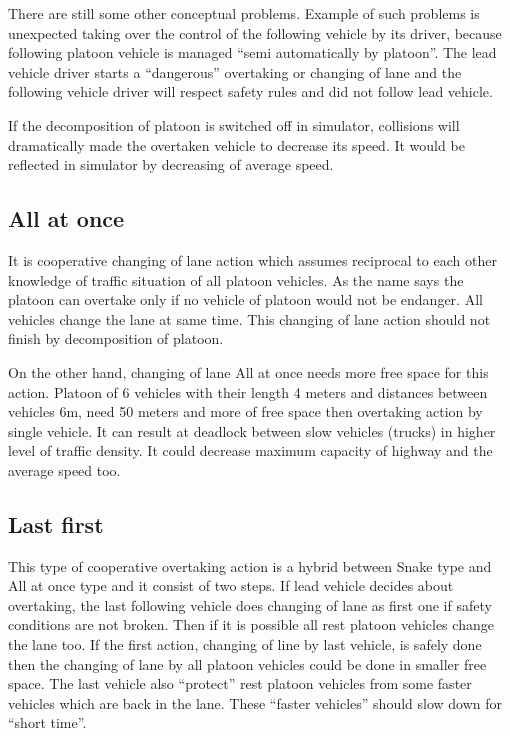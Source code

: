 There are still some other conceptual problems. Example of such problems is unexpected taking over the control of the following vehicle by its driver, because following platoon vehicle is managed “semi automatically by platoon”. The lead vehicle driver starts a “dangerous” overtaking or changing of lane and the following vehicle driver will respect safety rules and did not follow lead vehicle. 

If the decomposition of platoon is switched off in simulator, collisions will dramatically made the overtaken vehicle to decrease its speed. It would be reflected in simulator by decreasing of average speed.

\subsection{All at once}

It is cooperative changing of lane action which assumes reciprocal to each other knowledge of traffic situation of all platoon vehicles. As the name says the platoon can overtake only if no vehicle of platoon would not be endanger. All vehicles change the lane at same time. This changing of lane action should not finish by decomposition of platoon.

On the other hand, changing of lane All at once needs more free space for this action. Platoon of 6 vehicles with their length 4 meters and distances between vehicles 6m, need 50 meters and more of free space then overtaking action by single vehicle. It can result at deadlock between slow vehicles (trucks) in higher level of traffic density. It could decrease maximum capacity of highway and the average speed too.

\subsection{Last first}

This type of cooperative overtaking action is a hybrid between Snake type and All at once type and it consist of two steps. If lead vehicle decides about overtaking, the last following vehicle does changing of lane as first one if safety conditions are not broken. Then if it is possible all rest platoon vehicles change the lane too. If the first action, changing of line by last vehicle,  is safely done then the changing of lane by all platoon vehicles could  be done in  smaller free space. The last vehicle also “protect” rest platoon vehicles from some faster vehicles which are back in the lane. These “faster vehicles” should slow down for “short time”.

